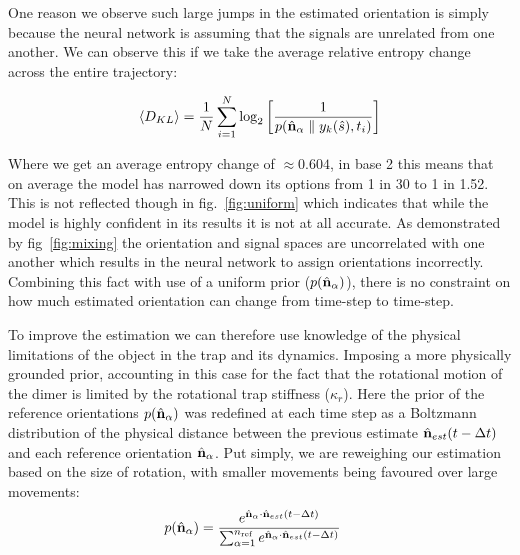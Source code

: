 One reason we observe such large jumps in the estimated 
orientation is simply because the neural network is assuming
that the signals are unrelated from one another. We can 
observe this if we take the average relative entropy change
across the entire trajectory:

\begin{align}
	\langle D_{KL}\rangle = \frac{1}{N} \sum_{i=1}^{N} \log_2 \left[\frac{1}{p(\hat{\bf n}_\alpha\parallel y_k(\hat{s}),t_i)}\right]
	\label{eq:score}
\end{align}

Where we get an average entropy change of $\approx 0.604$, in 
base 2 this means that on average the model has narrowed down 
its options from 1 in 30 to 1 in 1.52. This is not reflected
though in fig.~\ref{fig:uniform} which indicates that while 
the model is highly confident in its results it is not at all 
accurate. As demonstrated by fig~\ref{fig:mixing} the 
orientation and signal spaces are uncorrelated with one another 
which results in the neural network to assign orientations 
incorrectly. Combining this fact with use of a uniform prior 
($p(\hat{\bf n}_\alpha)$), there is no constraint on how much 
estimated orientation can change from time-step to time-step. 

To improve the estimation we can therefore use knowledge of the 
physical limitations of the object in the trap and its dynamics. 
Imposing a more physically grounded prior, accounting in this case 
for the fact that the rotational motion of the dimer is limited by 
the rotational trap stiffness ($\kappa_r$). Here the prior of the 
reference orientations $p(\hat{\bf n}_\alpha)$ was redefined at 
each time step as a Boltzmann distribution of the physical distance 
between the previous estimate $\hat{\bf n}_{est}(t-\Delta t)$ and 
each reference orientation $\hat{\bf n}_\alpha$. Put simply, we are 
reweighing our estimation based on the size of rotation, with smaller movements being favoured over large movements:
\begin{align}
	p(\hat{\bf n}_\alpha)
	&=\frac{e^{\hat{\bf n}_\alpha 
			\cdot \hat{\bf n}_{est}(t-\Delta t)}}
	{\sum_{\alpha=1}^{n_{\rm ref}}
		e^{\hat{\bf n}_\alpha 
			\cdot \hat{\bf n}_{est}(t-\Delta t)}}
	\label{eq:boltz}
\end{align}

